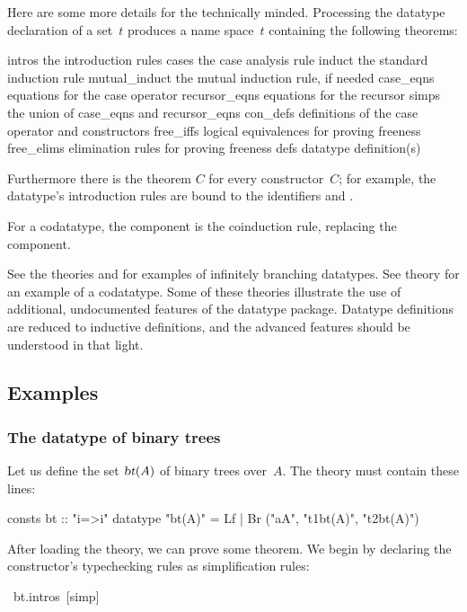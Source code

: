 Here are some more details for the technically minded.  Processing the
datatype declaration of a set~$t$ produces a name space~$t$ containing
the following theorems:
\begin{ttbox}\isastyleminor
intros          \textrm{the introduction rules}
cases           \textrm{the case analysis rule}
induct          \textrm{the standard induction rule}
mutual_induct   \textrm{the mutual induction rule, if needed}
case_eqns       \textrm{equations for the case operator}
recursor_eqns   \textrm{equations for the recursor}
simps           \textrm{the union of} case_eqns \textrm{and} recursor_eqns
con_defs        \textrm{definitions of the case operator and constructors}
free_iffs       \textrm{logical equivalences for proving freeness}
free_elims      \textrm{elimination rules for proving freeness}
defs            \textrm{datatype definition(s)}
\end{ttbox}
Furthermore there is the theorem $C$ for every constructor~$C$; for
example, the  datatype's introduction rules are bound to the
identifiers  and .

For a codatatype, the component  is the coinduction rule,
replacing the  component.

See the theories  and  for examples of
infinitely branching datatypes.  See theory  for an example
of a codatatype.  Some of these theories illustrate the use of additional,
undocumented features of the datatype package.  Datatype definitions are
reduced to inductive definitions, and the advanced features should be
understood in that light.


\subsection{Examples}

\subsubsection{The datatype of binary trees}

Let us define the set $\emph{\sl bt}(A)$ of binary trees over~$A$.  The theory
must contain these lines:
\begin{alltt*}\isastyleminor
consts   bt :: "i=>i"
datatype "bt(A)" = Lf | Br ("a\isasymin{}A", "t1\isasymin{}bt(A)", "t2\isasymin{}bt(A)")
\end{alltt*}
After loading the theory, we can prove some theorem.  
We begin by declaring the constructor's typechecking rules
as simplification rules:
\begin{isabelle}
\ bt.intros\ [simp]%
\end{isabelle}

